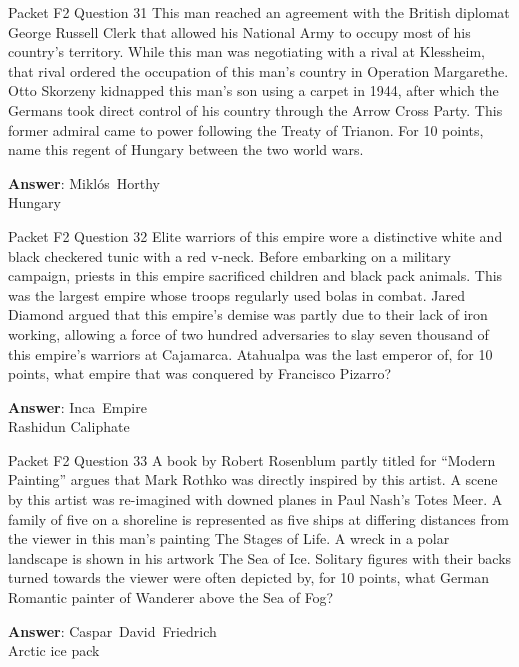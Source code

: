 \begin{frame}{Packet F2 Question 31}
This man reached an agreement with the British diplomat George Russell Clerk that allowed his National Army to occupy most of his country’s territory. While this man was negotiating with a rival at Klessheim, that rival ordered the occupation of this man’s country in Operation Margarethe. Otto Skorzeny kidnapped this man’s   son using a carpet in 1944, after which   the Germans took direct control of his country through the Arrow Cross Party.   This former admiral came to power following the Treaty of Trianon. For 10 points,   name this regent of Hungary between the   two world wars.

\textbf{Answer}: Miklós\ Horthy\\
 Hungary
\end{frame}

\begin{frame}{Packet F2 Question 32}
Elite warriors of this   empire wore a distinctive white and black checkered tunic with a red v-neck. Before embarking on a military campaign, priests in this empire sacrificed children and black pack animals. This was the largest empire whose troops regularly used bolas in combat. Jared Diamond argued   that this empire’s demise was partly due to their lack of iron working, allowing a force of two hundred adversaries to slay seven thousand of this empire’s warriors at Cajamarca. Atahualpa   was the last     emperor of, for 10 points, what empire that was conquered by Francisco Pizarro?

\textbf{Answer}: Inca\ Empire\\
 Rashidun Caliphate
\end{frame}

\begin{frame}{Packet F2 Question 33}
A book by Robert Rosenblum partly titled for “Modern Painting” argues that Mark Rothko was directly inspired by this artist. A scene by this artist was re-imagined with downed planes in Paul Nash’s Totes Meer. A family of five on a shoreline is represented as five ships at differing distances from the viewer in this man’s painting The Stages of Life. A wreck in   a polar landscape is shown in his artwork The Sea of Ice.     Solitary figures with their backs turned towards the viewer were often depicted by, for 10 points, what German Romantic   painter of Wanderer   above the Sea of Fog?

\textbf{Answer}: Caspar\ David\ Friedrich\\
 Arctic ice pack
\end{frame}

